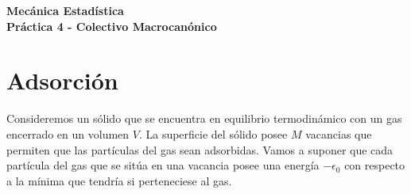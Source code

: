 \documentclass[a4paper,11pt]{article}
\begin{document}
\pagestyle{fancy}
\chead{\small \the\year}



\thispagestyle{plain}
\begin{center}
    \textbf{\large
        Mecánica Estadística \\
        Práctica 4 - Colectivo Macrocanónico
    }
\end{center}
\vspace{-1.5em}




\section{Adsorción}

Consideremos un sólido que se encuentra en equilibrio termodinámico con un
gas encerrado en un volumen $V$.
La superficie del sólido posee $M$ vacancias que permiten que las partículas
del gas sean adsorbidas. Vamos a suponer que cada partícula del gas que se
sitúa en una vacancia posee una energía $-\epsilon_0$ con respecto a la mínima
que tendría si perteneciese al gas.
\end{document}
